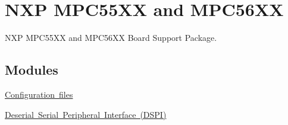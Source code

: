 \hypertarget{group__RTEMSBSPsPowerPCMPC55XX}{}\section{N\+XP M\+P\+C55\+XX and M\+P\+C56\+XX}
\label{group__RTEMSBSPsPowerPCMPC55XX}


N\+XP M\+P\+C55\+XX and M\+P\+C56\+XX Board Support Package.  


\subsection*{Modules}
\begin{DoxyCompactItemize}
\item 
\mbox{\hyperlink{group__mpc55xx__config}{Configuration files}}
\item 
\mbox{\hyperlink{group__mpc55xx__dspi}{Deserial Serial Peripheral Interface (\+D\+S\+P\+I)}}
\end{DoxyCompactItemize}
